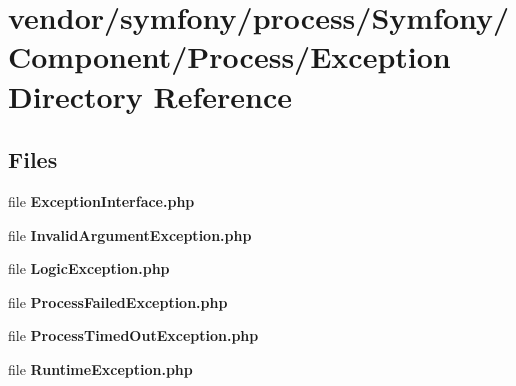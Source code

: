 \section{vendor/symfony/process/\+Symfony/\+Component/\+Process/\+Exception Directory Reference}
\label{dir_b1c55d45b0e1871deabd4fe33d92ea89}
\subsection*{Files}
\begin{DoxyCompactItemize}
\item 
file {\bf Exception\+Interface.\+php}
\item 
file {\bf Invalid\+Argument\+Exception.\+php}
\item 
file {\bf Logic\+Exception.\+php}
\item 
file {\bf Process\+Failed\+Exception.\+php}
\item 
file {\bf Process\+Timed\+Out\+Exception.\+php}
\item 
file {\bf Runtime\+Exception.\+php}
\end{DoxyCompactItemize}
